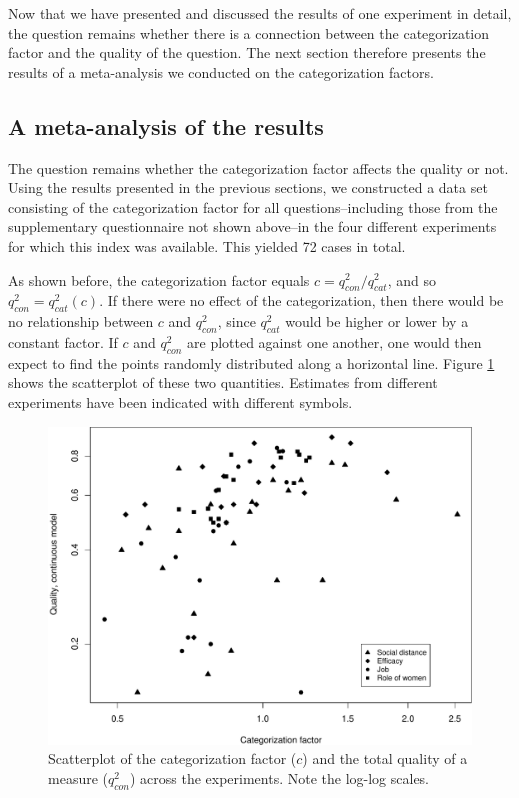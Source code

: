 \documentclass[a4paper,12pt]{article}
\begin{document}
Now that we have presented and discussed the results of one experiment in detail, the question remains whether there is a connection between the categorization factor and the quality of the question. The next section therefore presents the results of a meta-analysis we conducted on the categorization factors. 


\subsection{A meta-analysis of the results}

The question remains whether the categorization factor affects the quality or not.
Using the results presented in the previous sections, we constructed a data set consisting of the categorization factor for all questions--including those from the supplementary questionnaire not shown above--in the four different experiments for which this index was available. This yielded 72 cases in total. 

As shown before, the categorization factor equals $c = q^2_{con} / q^2_{cat}$, and so $q^2_{con} = q^2_{cat} (c)$. If there were no effect of the categorization, then there would be no relationship between $c$ and $q^2_{con}$, since $q^2_{cat}$ would be higher or lower by a constant factor. If  $c$ and $q^2_{con}$ are plotted against one another, one would then expect to find the points randomly distributed along a horizontal line. Figure \ref{fig:meta_scatter} shows the scatterplot of these two quantities. Estimates from different experiments have been indicated with different symbols.

\begin{figure}[bth] \centering
  \includegraphics[width=.75\textwidth]{i/figure-5.pdf} \caption{Scatterplot
    of the categorization factor ($c$) and the total quality of a
    measure ($q_{con}^2$) across the experiments. Note the log-log
    scales.\label{fig:meta_scatter}} \end{figure}
\end{document}
